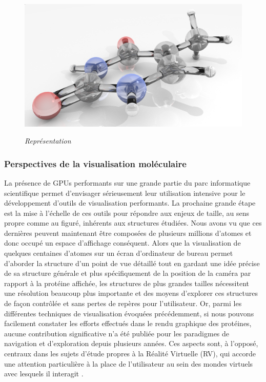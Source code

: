 \begin{figure}
  \centering
  {\includegraphics[width=.75\linewidth]{./figures/ch2/molecule_blender_glass}}
    \caption{{\it Représentation}}
  \label{Fig:molecule_blender_glass}
  \hspace{0.2cm}
\end{figure}


\subsubsection{Perspectives de la visualisation moléculaire}

La présence de GPUs performants sur une grande partie du parc informatique scientifique permet d'envisager sérieusement leur utilisation intensive pour le développement d'outils de visualisation performants. La prochaine grande étape est la mise à l'échelle de ces outils pour répondre aux enjeux de taille, au sens propre comme au figuré, inhérents aux structures étudiées. Nous avons vu que ces dernières peuvent maintenant être composées de plusieurs millions d'atomes et donc occupé un espace d'affichage conséquent. Alors que la visualisation de quelques centaines d'atomes sur un écran d'ordinateur de bureau permet d'aborder la structure d'un point de vue détaillé tout en gardant une idée précise de sa structure générale et plus spécifiquement de la position de la caméra par rapport à la protéine affichée, les structures de plus grandes tailles nécessitent une résolution beaucoup plus importante et des moyens d'explorer ces structures de façon contrôlée et sans pertes de repères pour l'utilisateur. Or, parmi les différentes techniques de visualisation évoquées précédemment, si nous pouvons facilement constater les efforts effectués dans le rendu graphique des protéines, aucune contribution significative n'a été publiée pour les paradigmes de navigation et d'exploration depuis plusieurs années. Ces aspects sont, à l'opposé, centraux dans les sujets d'étude propres à la Réalité Virtuelle (RV), qui accorde une attention particulière à la place de l'utilisateur au sein des mondes virtuels avec lesquels il interagit \cite{ortega_shocam_2015, khan_hovercam:_2005, he_virtual_1996}.

